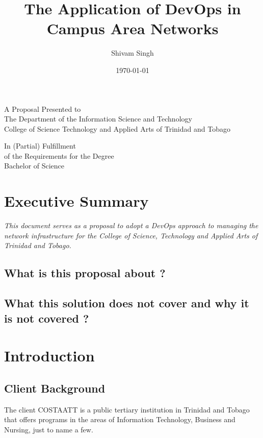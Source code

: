 \documentclass[12pt, letterpaper]{article}
\begin{document}
\title{The Application of DevOps in Campus Area Networks}
\author{Shivam Singh}
\date{\today}
\maketitle


\begin{center}

A Proposal Presented to\\ 
The Department of the Information Science and Technology\\
College of Science Technology and Applied Arts of Trinidad and Tobago 

\vspace{1cm}

In (Partial) Fulfillment\\
of the Requirements for the Degree\\
Bachelor of Science

\end{center}

\newpage
\tableofcontents

\newpage

\section{Executive Summary}

\begin{center}
\textit{This document serves as a proposal to adopt a DevOps approach to managing the network infrastructure for the College of Science, Technology and Applied Arts of Trinidad and Tobago.}
\end{center}

	\subsection{What is this proposal about ?}
	\subsection{What this solution does not cover and why it is not covered ?}
	
	
\newpage
\section{Introduction}

	\subsection{Client Background}
The client COSTAATT is a public tertiary institution in Trinidad and Tobago that offers programs in the areas of Information Technology, Business and Nursing, just to name a few.
	
\end{document}
